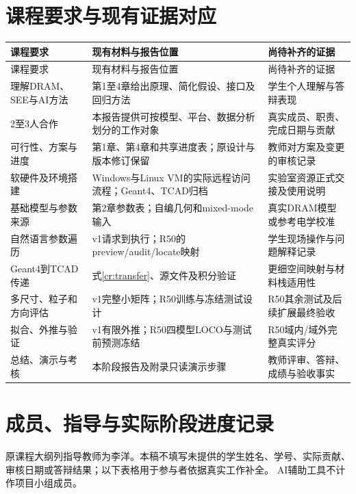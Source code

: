\section{课程要求与现有证据对应}
\small
\begin{longtable}{p{}p{}p{}}
\toprule
课程要求&现有材料与报告位置&尚待补齐的证据\\
\midrule
\endfirsthead
\toprule
课程要求&现有材料与报告位置&尚待补齐的证据\\
\midrule
\endhead
理解DRAM、SEE与AI方法&第1至4章给出原理、简化假设、接口及回归方法&学生个人理解与答辩表现\\
2至3人合作&本报告提供可按模型、平台、数据分析划分的工作对象&真实成员、职责、完成日期与贡献\\
可行性、方案与进度&第1章、第4章和共享进度表；原设计与版本修订保留&教师对方案及变更的审核记录\\
软硬件及环境搭建&Windows与Linux VM的实际远程访问流程；Geant4、TCAD归档&实验室资源正式交接及使用说明\\
基础模型与参数来源&第2章参数表；自编几何和mixed-mode输入&真实DRAM模型或参考电学校准\\
自然语言参数遍历&v1请求到执行；R50的preview/audit/locate映射&学生现场操作与问题解释记录\\
Geant4到TCAD传递&式\eqref{cr:transfer}、源文件及积分验证&更细空间映射与材料栈适用性\\
多尺寸、粒子和方向评估&v1完整小矩阵；R50训练与冻结测试设计&R50其余测试及后续扩展最终验收\\
拟合、外推与验证&v1有限外推；R50四模型LOCO与测试前预测冻结&R50域内/域外完整真实评分\\
总结、演示与考核&本阶段报告及附录只读演示步骤&教师评审、答辩、成绩与验收事实\\
\bottomrule
\end{longtable}
\normalsize

\clearpage
\section{成员、指导与实际阶段进度记录}
原课程大纲列指导教师为李洋。本稿不填写未提供的学生姓名、学号、实际贡献、
审核日期或答辩结果；以下表格用于参与者依据真实工作补全。
AI辅助工具不计作项目小组成员。

